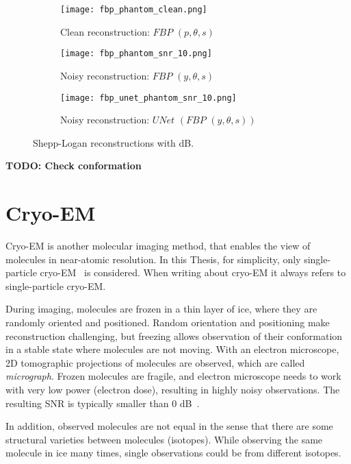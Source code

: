 \begin{figure}[H]
    \captionsetup[subfigure]{justification=centering}
    \centering
    \begin{subfigure}[t]{0.3\textwidth}
        \texttt{[image: fbp\_phantom\_clean.png]}
        \caption{Clean reconstruction: $\textit{FBP }(p, \theta, s)$}
        \label{fig:fbp_phantom}
    \end{subfigure}\hfill
    \begin{subfigure}[t]{0.3\textwidth}
      \texttt{[image: fbp\_phantom\_snr\_10.png]}
      \caption{Noisy reconstruction: $\textit{FBP }(y, \theta, s)$}
      \label{fig:fbp_phantom_noisy}
    \end{subfigure}\hfill
    \begin{subfigure}[t]{0.3\textwidth}
      \texttt{[image: fbp\_unet\_phantom\_snr\_10.png]}
      \caption{Noisy reconstruction: $\textit{UNet }(\textit{FBP }(y, \theta, s))$}
      \label{fig:fbp_unet_phantom_noisy}
    \end{subfigure}
    \caption{Shepp-Logan reconstructions with  dB.}
    \label{fig:phantom_fbps}
  \end{figure}

  \textbf{TODO: Check conformation}

\section{Cryo-EM}
Cryo-EM is another molecular imaging method, that enables the view of molecules in near-atomic resolution.
In this Thesis, for simplicity, only single-particle cryo-EM~\cite{singleParticleCryoEm} is considered.
When writing about cryo-EM it always refers to single-particle cryo-EM.

During imaging, molecules are frozen in a thin layer of ice, where they are randomly oriented and positioned. 
Random orientation and positioning make reconstruction challenging, 
but freezing allows observation of their conformation in a stable state where molecules are not moving.
With an electron microscope, 2D tomographic projections of molecules are observed,
which are called \textit{micrograph}. 
Frozen molecules are fragile, and electron microscope needs to work with
very low power (electron dose), resulting in highly noisy observations. The resulting SNR
is typically smaller than 0 dB~\cite{cryoEmMath2}.

In addition, observed molecules are not equal in the sense that there are some structural varieties between
molecules (isotopes). While observing the same molecule in ice many times, single observations could be from different isotopes.

